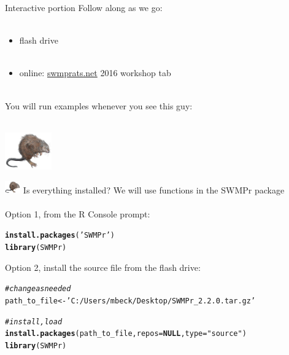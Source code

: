 \documentclass[xcolor=dvipsnames,serif]{beamer}\usepackage[]{graphicx}\usepackage[]{color}
\makeatletter
\newcommand{\hlstr}[1]{\textcolor[rgb]{0.192,0.494,0.8}{#1}}%
\newcommand{\hlcom}[1]{\textcolor[rgb]{0.678,0.584,0.686}{\textit{#1}}}%
\newcommand{\hlstd}[1]{\textcolor[rgb]{0.345,0.345,0.345}{#1}}%
\newcommand{\hlkwa}[1]{\textcolor[rgb]{0.161,0.373,0.58}{\textbf{#1}}}%
\newcommand{\hlkwb}[1]{\textcolor[rgb]{0.69,0.353,0.396}{#1}}%
\newcommand{\hlkwc}[1]{\textcolor[rgb]{0.333,0.667,0.333}{#1}}%
\newcommand{\hlkwd}[1]{\textcolor[rgb]{0.737,0.353,0.396}{\textbf{#1}}}%
\newenvironment{kframe}{%
 \def\at@end@of@kframe{}%
 \ifinner\ifhmode%
  \def\at@end@of@kframe{\end{minipage}}%
  \begin{minipage}{\columnwidth}%
 \fi\fi%
 \def\FrameCommand##1{\hskip\@totalleftmargin \hskip-\fboxsep
 \colorbox{shadecolor}{##1}\hskip-\fboxsep
     \hskip-\linewidth \hskip-\@totalleftmargin \hskip\columnwidth}%
 \MakeFramed {\advance\hsize-\width
   \@totalleftmargin\z@ \linewidth\hsize
   \@setminipage}}%
 {\par\unskip\endMakeFramed%
 \at@end@of@kframe}
\newenvironment{knitrout}{}{} %
\makeatother
\begin{document}
\begin{frame}{Interactive portion}
\onslide<+->
Follow along as we go:\\~\\
\begin{itemize}
\item flash drive\\~\\
\item online: \href{http://swmprats.net/}{swmprats.net} 2016 workshop tab \\~\\
\end{itemize}
\onslide<+->
You will run examples whenever you see this guy: \\~\\
\centerline{\includegraphics[width = 0.15\textwidth]{imgs/swmprat.png}} 
\end{frame}

\begin{frame}[fragile]{\includegraphics[width = 0.05\textwidth]{imgs/swmprat.png} Is everything installed?}
We will use functions in the SWMPr package \\~\\
Option 1, from the R Console prompt:
\begin{knitrout}\scriptsize
{}\color{fgcolor}\begin{kframe}
\begin{alltt}
\hlkwd{install.packages}\hlstd{(}\hlstr{'SWMPr'}\hlstd{)}
\hlkwd{library}\hlstd{(SWMPr)}
\end{alltt}
\end{kframe}
\end{knitrout}
\vspace{0.1in}
Option 2, install the source file from the flash drive:
\begin{knitrout}\scriptsize
{}\color{fgcolor}\begin{kframe}
\begin{alltt}
\hlcom{# change as needed}
\hlstd{path_to_file} \hlkwb{<-} \hlstr{'C:/Users/mbeck/Desktop/SWMPr_2.2.0.tar.gz'}

\hlcom{# install, load}
\hlkwd{install.packages}\hlstd{(path_to_file,} \hlkwc{repos} \hlstd{=} \hlkwa{NULL}\hlstd{,} \hlkwc{type}\hlstd{=}\hlstr{"source"}\hlstd{)}
\hlkwd{library}\hlstd{(SWMPr)}
\end{alltt}
\end{kframe}
\end{knitrout}
\end{frame}
\end{document}
